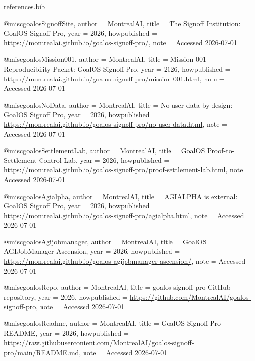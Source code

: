 \begin{filecontents*}{references.bib}

@misc{goalosSignoffSite,
  author       = {{MontrealAI}},
  title        = {{The Signoff Institution: GoalOS Signoff Pro}},
  year         = {2026},
  howpublished = {\url{https://montrealai.github.io/goalos-signoff-pro/}},
  note         = {Accessed 2026-07-01}
}

@misc{goalosMission001,
  author       = {{MontrealAI}},
  title        = {{Mission 001 Reproducibility Packet: GoalOS Signoff Pro}},
  year         = {2026},
  howpublished = {\url{https://montrealai.github.io/goalos-signoff-pro/mission-001.html}},
  note         = {Accessed 2026-07-01}
}

@misc{goalosNoData,
  author       = {{MontrealAI}},
  title        = {{No user data by design: GoalOS Signoff Pro}},
  year         = {2026},
  howpublished = {\url{https://montrealai.github.io/goalos-signoff-pro/no-user-data.html}},
  note         = {Accessed 2026-07-01}
}

@misc{goalosSettlementLab,
  author       = {{MontrealAI}},
  title        = {{GoalOS Proof-to-Settlement Control Lab}},
  year         = {2026},
  howpublished = {\url{https://montrealai.github.io/goalos-signoff-pro/proof-settlement-lab.html}},
  note         = {Accessed 2026-07-01}
}

@misc{goalosAgialpha,
  author       = {{MontrealAI}},
  title        = {{AGIALPHA is external: GoalOS Signoff Pro}},
  year         = {2026},
  howpublished = {\url{https://montrealai.github.io/goalos-signoff-pro/agialpha.html}},
  note         = {Accessed 2026-07-01}
}

@misc{goalosAgijobmanager,
  author       = {{MontrealAI}},
  title        = {{GoalOS AGIJobManager Ascension}},
  year         = {2026},
  howpublished = {\url{https://montrealai.github.io/goalos-agijobmanager-ascension/}},
  note         = {Accessed 2026-07-01}
}

@misc{goalosRepo,
  author       = {{MontrealAI}},
  title        = {{goalos-signoff-pro GitHub repository}},
  year         = {2026},
  howpublished = {\url{https://github.com/MontrealAI/goalos-signoff-pro}},
  note         = {Accessed 2026-07-01}
}

@misc{goalosReadme,
  author       = {{MontrealAI}},
  title        = {{GoalOS Signoff Pro README}},
  year         = {2026},
  howpublished = {\url{https://raw.githubusercontent.com/MontrealAI/goalos-signoff-pro/main/README.md}},
  note         = {Accessed 2026-07-01}
}


\end{filecontents*}
